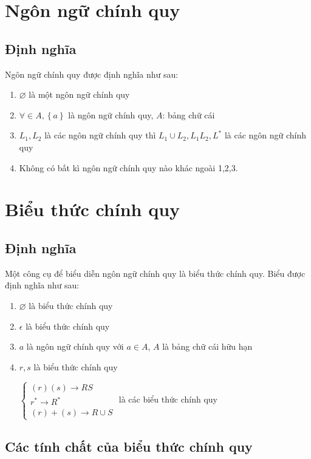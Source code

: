 \documentclass[14pt]{extreport}
\begin{document}
\section{Ngôn ngữ chính quy}
\subsection{Định nghĩa}

Ngôn ngữ chính quy được định nghĩa như sau:

\begin{enumerate}
\item $\varnothing$ là một ngôn ngữ chính quy
\item $\forall \in A,\left\{a\right\}$ là ngôn ngữ chính quy, $A$: bảng chữ cái
\item $L_1,L_2$ là các ngôn ngữ chính quy thì $L_1 \cup L_2,L_1L_2,L^*$ là các ngôn ngữ chính quy
\item Không có bất kì ngôn ngữ chính quy nào khác ngoài 1,2,3.
\end{enumerate}

\section{Biểu thức chính quy}
\subsection{Định nghĩa}

Một công cụ để biểu diễn ngôn ngữ chính quy là biểu thức chính quy. Biểu được định nghĩa như sau:

\begin{enumerate}
\item $\varnothing$ là biểu thức chính quy
\item $\epsilon$ là biểu thức chính quy
\item $a$ là ngôn ngữ chính quy với $a \in A$, $A$ là bảng chữ cái hữu hạn
\item $r,s$ là biểu thức chính quy

$\left\{\begin{matrix}
(r)(s)\rightarrow RS\\ 
r^{*}\rightarrow R^{*}
\\ (r)+(s)\rightarrow R\cup S

\end{matrix}\right.$ là các biểu thức chính quy
\end{enumerate}
\subsection{Các tính chất của biểu thức chính quy}
\end{document}

